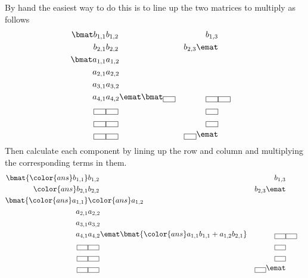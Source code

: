 By hand the easiest way to do this is to line up the two matrices to multiply as follows
\begin{eqnarray*}
\bmat
b_{1,1} & b_{1,2} & b_{1,3} \\
b_{2,1} & b_{2,2} & b_{2,3}
\emat \\
\bmat
a_{1,1} & a_{1,2} \\
a_{2,1} & a_{2,2} \\
a_{3,1} & a_{3,2} \\
a_{4,1} & a_{4,2}
\emat
\bmat
\fbox{\hspace{8pt}} & \fbox{\hspace{8pt}} & \fbox{\hspace{8pt}} \\
\fbox{\hspace{8pt}} & \fbox{\hspace{8pt}} & \fbox{\hspace{8pt}} \\
\fbox{\hspace{8pt}} & \fbox{\hspace{8pt}} & \fbox{\hspace{8pt}} \\
\fbox{\hspace{8pt}} & \fbox{\hspace{8pt}} & \fbox{\hspace{8pt}}
\emat
\end{eqnarray*}
Then calculate each component by lining up the row and column and multiplying the corresponding terms in them.
\begin{eqnarray*}
\bmat
{\color{ans}b_{1,1}} & b_{1,2} & b_{1,3} \\
{\color{ans}b_{2,1}} & b_{2,2} & b_{2,3}
\emat \\
\bmat
{\color{ans}a_{1,1}} & {\color{ans}a_{1,2}} \\
a_{2,1} & a_{2,2} \\
a_{3,1} & a_{3,2} \\
a_{4,1} & a_{4,2}
\emat
\bmat
{\color{ans}a_{1,1}b_{1,1}+a_{1,2}b_{2,1}} & \fbox{\hspace{8pt}} & \fbox{\hspace{8pt}} \\
\fbox{\hspace{8pt}} & \fbox{\hspace{8pt}} & \fbox{\hspace{8pt}} \\
\fbox{\hspace{8pt}} & \fbox{\hspace{8pt}} & \fbox{\hspace{8pt}} \\
\fbox{\hspace{8pt}} & \fbox{\hspace{8pt}} & \fbox{\hspace{8pt}}
\emat
\end{eqnarray*}
